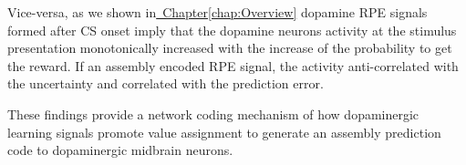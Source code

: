 \begin{itemize}
    Vice-versa, as we shown in\hyperref[chap:Overview]{~Chapter\ref*{chap:Overview}} dopamine RPE signals formed after CS onset imply that the dopamine neurons activity at the stimulus presentation monotonically increased with the increase of the probability to get the reward.
    If an assembly encoded RPE signal, the activity anti-correlated with the uncertainty and correlated with the prediction error.
\end{itemize}
  These findings provide a network coding mechanism of how dopaminergic learning signals promote value assignment to generate an assembly prediction code to dopaminergic midbrain neurons. 